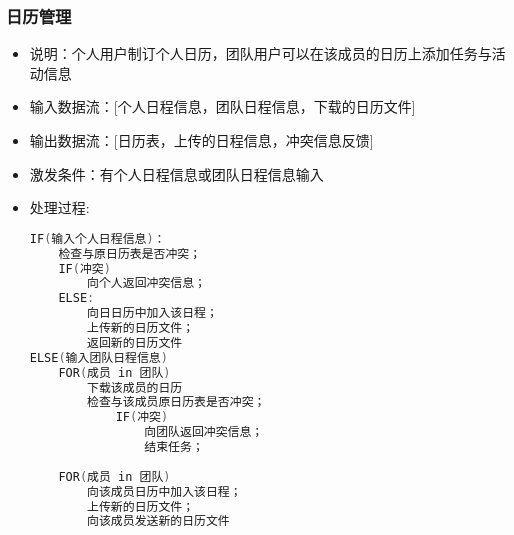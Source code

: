             \subsubsection{日历管理}
            \begin{itemize}
                \item 说明：个人用户制订个人日历，团队用户可以在该成员的日历上添加任务与活动信息
                \item 输入数据流：[个人日程信息，团队日程信息，下载的日历文件]
                \item 输出数据流：[日历表，上传的日程信息，冲突信息反馈]
                \item 激发条件：有个人日程信息或团队日程信息输入
                \item 处理过程:
\begin{lstlisting}[language=C, caption=日历管理, label={code:first-code}]
IF(输入个人日程信息)：
    检查与原日历表是否冲突；
    IF(冲突) 
        向个人返回冲突信息；
    ELSE:
        向日日历中加入该日程；
        上传新的日历文件；
        返回新的日历文件
ELSE(输入团队日程信息)
    FOR(成员 in 团队)
        下载该成员的日历
        检查与该成员原日历表是否冲突；
            IF(冲突) 
                向团队返回冲突信息；
                结束任务；
                    
    FOR(成员 in 团队)
        向该成员日历中加入该日程；
        上传新的日历文件；
        向该成员发送新的日历文件
\end{lstlisting}
            \end{itemize}
